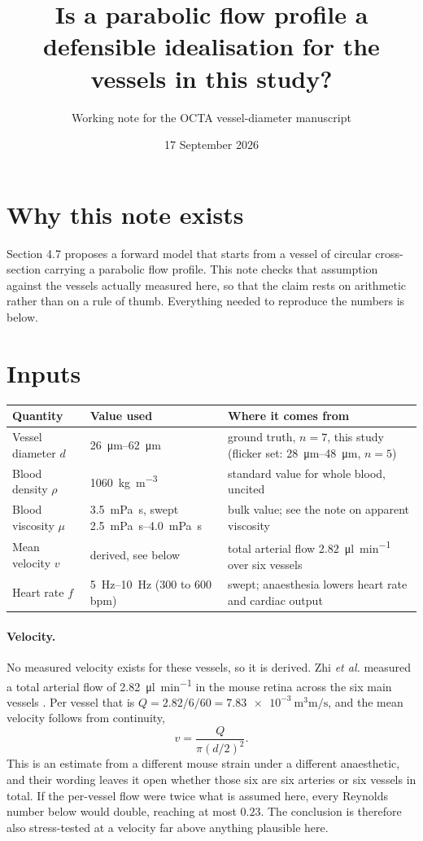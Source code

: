 \documentclass[11pt,a4paper]{article}
\title{Is a parabolic flow profile a defensible idealisation for the vessels in this study?}
\author{Working note for the OCTA vessel-diameter manuscript}
\date{17 September 2026}
\begin{document}
\maketitle

\section*{Why this note exists}
Section 4.7 proposes a forward model that starts from a vessel of circular cross-section carrying a
parabolic flow profile. This note checks that assumption against the vessels actually measured here,
so that the claim rests on arithmetic rather than on a rule of thumb. Everything needed to reproduce
the numbers is below.

\section*{Inputs}
\begin{tabularx}{\textwidth}{@{}l l X@{}}
\toprule
Quantity & Value used & Where it comes from \\ \midrule
Vessel diameter $d$ & \SIrange{26}{62}{\micro\metre} & ground truth, $n=7$, this study (flicker set: \SIrange{28}{48}{\micro\metre}, $n=5$) \\
Blood density $\rho$ & \SI{1060}{\kilo\gram\per\cubic\metre} & standard value for whole blood, uncited \\
Blood viscosity $\mu$ & \SI{3.5}{\milli\pascal\second}, swept \SIrange{2.5}{4.0}{\milli\pascal\second} & bulk value; see the note on apparent viscosity \cite{pries1992} \\
Mean velocity $v$ & derived, see below & total arterial flow \SI{2.82}{\micro\litre\per\minute} over six vessels \cite{zhi2012} \\
Heart rate $f$ & \SIrange{5}{10}{\hertz} (300 to 600 bpm) & swept; anaesthesia lowers heart rate and cardiac output \cite{janssen2004} \\ \bottomrule
\end{tabularx}

\paragraph{Velocity.} No measured velocity exists for these vessels, so it is derived. Zhi \textit{et al.}
measured a total arterial flow of \SI{2.82}{\micro\litre\per\minute} in the mouse retina across the six
main vessels \cite{zhi2012}. Per vessel that is $Q = 2.82/6/60 = \SI{7.83e-3}{\cubic\milli\metre\per\second}$,
and the mean velocity follows from continuity,
\begin{equation}
v = \frac{Q}{\pi (d/2)^2}.
\end{equation}
This is an estimate from a different mouse strain under a different anaesthetic, and their wording leaves it
open whether those six are six arteries or six vessels in total. If the per-vessel flow were twice what is
assumed here, every Reynolds number below would double, reaching at most $0.23$. The conclusion is
therefore also stress-tested at a velocity far above anything plausible here.
\end{document}
